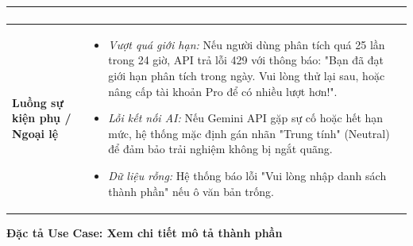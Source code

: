\documentclass[12pt,a4paper]{article}
\begin{document}
\begin{center}
\begin{tabular}{|p{4cm}|p{10cm}|}
\begin{enumerate}
\end{enumerate} \\ \hline
\textbf{Luồng sự kiện phụ / Ngoại lệ} & 
\begin{itemize}
    \item \textit{Vượt quá giới hạn:} Nếu người dùng phân tích quá 25 lần trong 24 giờ, API trả lỗi 429 với thông báo: "Bạn đã đạt giới hạn phân tích trong ngày. Vui lòng thử lại sau, hoặc nâng cấp tài khoản Pro để có nhiều lượt hơn!".
    \item \textit{Lỗi kết nối AI:} Nếu Gemini API gặp sự cố hoặc hết hạn mức, hệ thống mặc định gán nhãn "Trung tính" (Neutral) để đảm bảo trải nghiệm không bị ngắt quãng.
    \item \textit{Dữ liệu rỗng:} Hệ thống báo lỗi "Vui lòng nhập danh sách thành phần" nếu ô văn bản trống.
\end{itemize} \\ \hline
\end{tabular}
\end{center}







\vspace{0.5cm}
\textbf{Đặc tả Use Case: Xem chi tiết mô tả thành phần}
\end{document}
